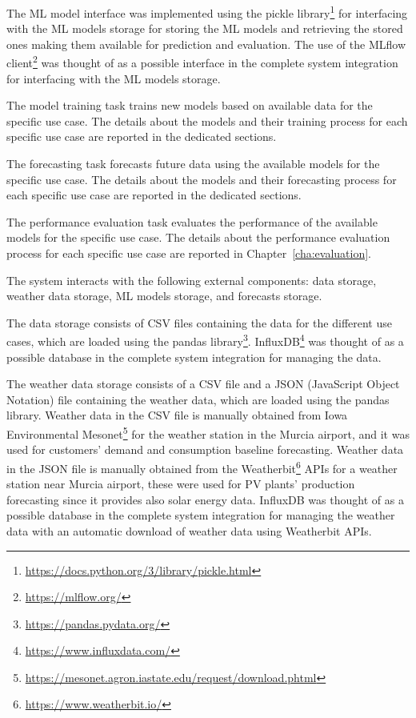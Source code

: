 The ML model interface was implemented using the pickle library\footnote{ \url{https://docs.python.org/3/library/pickle.html} } for interfacing with the ML models storage for storing the ML models and retrieving the stored ones making them available for prediction and evaluation.
The use of the MLflow client\footnote{ \url{https://mlflow.org/} } was thought of as a possible interface in the complete system integration for interfacing with the ML models storage.

The model training task trains new models based on available data for the specific use case.
The details about the models and their training process for each specific use case are reported in the dedicated sections.

The forecasting task forecasts future data using the available models for the specific use case.
The details about the models and their forecasting process for each specific use case are reported in the dedicated sections.

The performance evaluation task evaluates the performance of the available models for the specific use case.
The details about the performance evaluation process for each specific use case are reported in Chapter~\ref{cha:evaluation}.

The system interacts with the following external components: data storage, weather data storage, ML models storage, and forecasts storage.

The data storage consists of CSV files containing the data for the different use cases, which are loaded using the pandas library\footnote{ \url{https://pandas.pydata.org/} }.
InfluxDB\footnote{ \url{https://www.influxdata.com/} } was thought of as a possible database in the complete system integration for managing the data.

The weather data storage consists of a CSV file and a JSON (JavaScript Object Notation) file containing the weather data, which are loaded using the pandas library.
Weather data in the CSV file is manually obtained from Iowa Environmental Mesonet\footnote{ \url{https://mesonet.agron.iastate.edu/request/download.phtml} } for the weather station in the Murcia airport, and it was used for customers’ demand and consumption baseline forecasting.
Weather data in the JSON file is manually obtained from the Weatherbit\footnote{ \url{https://www.weatherbit.io/} } APIs for a weather station near Murcia airport, these were used for PV plants' production forecasting since it provides also solar energy data.
InfluxDB was thought of as a possible database in the complete system integration for managing the weather data with an automatic download of weather data using Weatherbit APIs.

